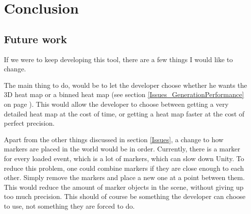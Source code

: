 \section{Conclusion}
\label{Conclusion}



\subsection{Future work}
\label{Conclusion_Future}

If we were to keep developing this tool, there are a few things I would like to change.

The main thing to do, would be to let the developer choose whether he wants the 3D heat map or a binned heat map (see section \ref{Issues_GenerationPerformance} on page \pageref{Issues_GenerationPerformance}). This would allow the developer to choose between getting a very detailed heat map at the cost of time, or getting a heat map faster at the cost of perfect precision.

Apart from the other things discussed in section \ref{Issues}, a change to how markers are placed in the world would be in order. Currently, there is a marker for every loaded event, which is a lot of markers, which can slow down Unity. To reduce this problem, one could combine markers if they are close enough to each other. Simply remove the markers and place a new one at a point between them. This would reduce the amount of marker objects in the scene, without giving up too much precision. This should of course be something the developer can choose to use, not something they are forced to do.